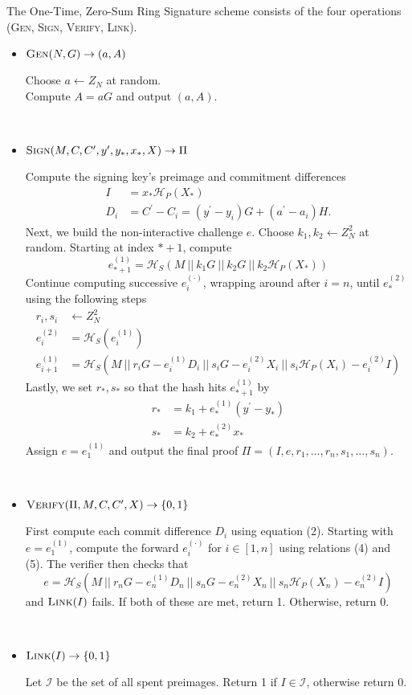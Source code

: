 \documentclass{article}
\newcommand{\algoname}[1]{\textnormal{\textsc{#1}}}
\newcommand{\gen}{\algoname{Gen}}
\newcommand{\sign}{\algoname{Sign}}
\newcommand{\verify}{\algoname{Verify}}
\newcommand{\link}{\algoname{Link}}
\newcommand{\sidx}{\ensuremath{*}}
\newcommand{\sx}{\ensuremath{x_\sidx}}
\newcommand{\ipk}{\ensuremath{X_i}}
\newcommand{\spk}{\ensuremath{X_\sidx}}
\newcommand{\iy}{\ensuremath{y_i}}
\newcommand{\sy}{\ensuremath{y_\sidx}}
\newcommand{\oy}{\ensuremath{y^\prime}}
\newcommand{\iC}{\ensuremath{C_i}}
\newcommand{\oC}{\ensuremath{C^\prime}}
\newcommand{\setI}{\ensuremath{\mathcal{I}}}
\newcommand{\hs}{\ensuremath{\mathcal{H}_S}}
\newcommand{\hp}{\ensuremath{\mathcal{H}_P}}
\begin{document}
The One-Time, Zero-Sum Ring Signature scheme consists of the four operations
({\gen}, {\sign}, {\verify}, {\link}).  
\begin{itemize}
  \item ${\gen}(N, G) \rightarrow (a, A)$

    Choose $a \leftarrow Z_N$ at random. \\
    Compute $A=aG$ and output $(a, A)$.

\ \\

  \item ${\sign}(M, C, {\oC}, {\oy}, {\sy}, {\sx}, X) \rightarrow \Pi $

    Compute the signing key's preimage and commitment differences
    \begin{align}
      I   &= {\sx} \hp({\spk}) \\
      D_i &= {\oC} - {\iC} = ({\oy} - {\iy}) G + (a^\prime - a_i)H.
    \end{align}
    Next, we build the non-interactive challenge $e$.  Choose $k_1, k_2
    \leftarrow Z_N^2$ at random.  Starting at index $*+1$, compute \[
    e_{*+1}^{(1)} = \hs(M ~ || ~ k_1 G ~ || ~ k_2 G ~ || ~ k_2 \hp(\spk) )\]
    Continue computing successive $e_i^{(\cdot)}$, wrapping around after $i=n$,
    until $e_{*}^{(2)}$ using the following steps 
    \begin{align} 
      r_i, s_i &\leftarrow Z_N^2 \\
      e_i^{(2)} &= \hs(e_i^{(1)}) \\
      e_{i+1}^{(1)} &= \hs(M ~ || ~ r_iG - e_i^{(1)}D_i ~ || ~ s_iG - e_i^{(2)}{\ipk} ~ || ~ s_i \hp({\ipk}) - e_i^{(2)}I)
    \end{align}
    Lastly, we set $r_*, s_*$ so that the hash hits $e_{*+1}^{(1)}$
    by
    \begin{align*}
      r_* &= k_1 + e_*^{(1)}({\oy} - {\sy}) \\
      s_* &= k_2 + e_*^{(2)}{\sx}
    \end{align*}
    Assign $e=e_1^{(1)}$ and output the final proof 
    $\Pi = (I, e, r_1, \dots, r_n, s_1, \dots, s_n)$.

\ \\

  \item ${\verify}(\Pi, M, C, {\oC}, X) \rightarrow \{0,1\} $

    First compute each commit difference $D_i$ using equation (2).  Starting
    with $e=e_1^{(1)}$, compute the forward $e_i^{(\cdot)}$ for $i \in [1, n]$
    using relations (4) and (5).  The verifier then checks that 
    \[e = \hs(M ~ 
    || ~ r_nG - e_n^{(1)}D_n ~ 
    || ~ s_nG - e_n^{(2)}X_n ~ 
    || ~ s_n \hp(X_n) - e_n^{(2)}I)\]
    and ${\link}(I)$ fails.  If both of these are met, return 1. Otherwise, return
    0.

\ \\

  \item $\link(I) \rightarrow \{0,1\}$

  Let {\setI} be the set of all spent preimages.  Return 1 if $I \in {\setI}$,
  otherwise return 0.
\end{itemize}
\end{document}
